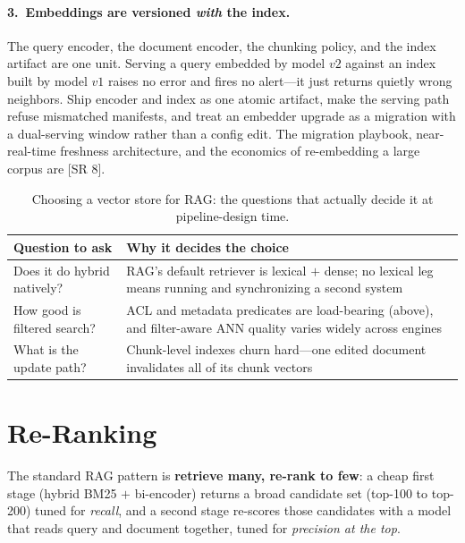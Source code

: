 \paragraph{3.\ Embeddings are versioned \emph{with} the index.}
The query encoder, the document encoder, the chunking policy, and the index
artifact are one unit.  Serving a query embedded by model $v2$ against an index
built by model $v1$ raises no error and fires no alert---it just returns
quietly wrong neighbors.  Ship encoder and index as one atomic artifact, make
the serving path refuse mismatched manifests, and treat an embedder upgrade as
a migration with a dual-serving window rather than a config edit.  The
migration playbook, near-real-time freshness architecture, and the economics
of re-embedding a large corpus are [SR 8].

\begin{table}[H]
\centering
\small
\caption{Choosing a vector store for RAG: the questions that actually decide
it at pipeline-design time.}
\label{tab:vector-dbs}%
\begin{tabularx}{\textwidth}{@{}l X@{}}
\toprule
\textbf{Question to ask} & \textbf{Why it decides the choice} \\
\midrule
Does it do hybrid natively? & RAG's default retriever is lexical $+$ dense; no lexical leg means running and synchronizing a second system \\
How good is filtered search? & ACL and metadata predicates are load-bearing (above), and filter-aware ANN quality varies widely across engines \\
What is the update path? & Chunk-level indexes churn hard---one edited document invalidates all of its chunk vectors \\
\bottomrule
\end{tabularx}
\end{table}


\section{Re-Ranking}
\label{sec:reranking}

The standard RAG pattern is \textbf{retrieve many, re-rank to few}: a cheap
first stage (hybrid BM25 $+$ bi-encoder) returns a broad candidate set
(top-100 to top-200) tuned for \emph{recall}, and a second stage re-scores
those candidates with a model that reads query and document together, tuned
for \emph{precision at the top}.

